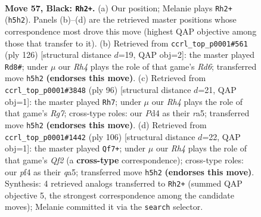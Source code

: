 \documentclass[11pt]{article}
\begin{document}
\clearpage

\begin{figure}[p]\centering
\begin{subfigure}{0.46\textwidth}\centering
\resizebox{\linewidth}{!}{%
\newchessgame
\chessboard[
  setfen={8/6pk/1P6/7r/3ppP2/8/5K2/3q4 b - - 4 57},
  showmover=false,
  pgfstyle=straightmove, color=movearrow, markmove={h5-h2}
]}
\caption{}
\end{subfigure}\hfill
\begin{subfigure}{0.46\textwidth}\centering
\resizebox{\linewidth}{!}{%
\newchessgame
\chessboard[
  setfen={1k6/8/PK1R4/5P2/7p/1P5P/8/8 w - - 3 64},
  showmover=false,
  pgfstyle=straightmove, color=movearrow, markmove={d6-d8}
]}
\caption{}
\end{subfigure}
\\[4pt]
\begin{subfigure}{0.46\textwidth}\centering
\resizebox{\linewidth}{!}{%
\newchessgame
\chessboard[
  setfen={4k3/6R1/5P2/r7/3p3p/8/5PK1/8 w - - 0 49},
  showmover=false,
  pgfstyle=straightmove, color=movearrow, markmove={g7-h7}
]}
\caption{}
\end{subfigure}\hfill
\begin{subfigure}{0.46\textwidth}\centering
\resizebox{\linewidth}{!}{%
\newchessgame
\chessboard[
  setfen={8/7k/6p1/q7/2p4P/6P1/5Q2/6K1 w - - 0 54},
  showmover=false,
  pgfstyle=straightmove, color=movearrow, markmove={f2-f7}
]}
\caption{}
\end{subfigure}
\caption{\textbf{Move 57, Black: \texttt{Rh2+}.} (a) Our position; Melanie plays \texttt{Rh2+} (\texttt{h5h2}). Panels (b)--(d) are the retrieved master positions whose correspondence most drove this move (highest QAP objective among those that transfer to it). (b) Retrieved from \texttt{ccrl\_top\_p0001\#561} (ply 126) [structural distance $d$=19, QAP obj=2]: the master played \texttt{Rd8\#}; under $\mu$ our \emph{Rh4} plays the role of that game's \emph{Rd6}; transferred move \texttt{h5h2} \textbf{(endorses this move)}. (c) Retrieved from \texttt{ccrl\_top\_p0001\#3848} (ply 96) [structural distance $d$=21, QAP obj=1]: the master played \texttt{Rh7}; under $\mu$ our \emph{Rh4} plays the role of that game's \emph{Rg7}; cross-type roles: our \emph{P}d4 as their \emph{r}a5; transferred move \texttt{h5h2} \textbf{(endorses this move)}. (d) Retrieved from \texttt{ccrl\_top\_p0001\#1442} (ply 106) [structural distance $d$=22, QAP obj=1]: the master played \texttt{Qf7+}; under $\mu$ our \emph{Rh4} plays the role of that game's \emph{Qf2} (a \textbf{cross-type} correspondence); cross-type roles: our \emph{p}f4 as their \emph{q}a5; transferred move \texttt{h5h2} \textbf{(endorses this move)}. Synthesis: 4 retrieved analogs transferred to \texttt{Rh2+} (summed QAP objective 5, the strongest correspondence among the candidate moves); Melanie committed it via the \texttt{search} selector.}
\label{fig:thought-m113}
\end{figure}
\end{document}
